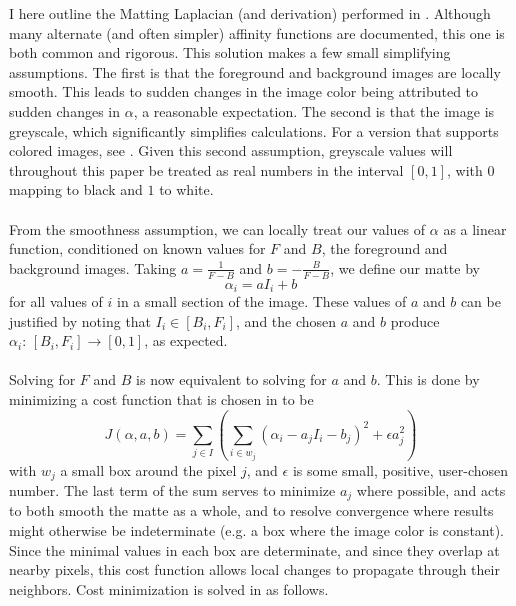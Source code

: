 I here outline the Matting Laplacian (and derivation) performed in \cite{levin08}. Although many alternate (and often simpler) affinity functions are documented, this one is both common and rigorous. This solution makes a few small simplifying assumptions. The first is that the foreground and background images are locally smooth. This leads to sudden changes in the image color being attributed to sudden changes in $\alpha$, a reasonable expectation. The second is that the image is greyscale, which significantly simplifies calculations. For a version that supports colored images, see \cite{levin08}. Given this second assumption, greyscale values will throughout this paper be treated as real numbers in the interval $[0,1]$, with $0$ mapping to black and $1$ to white.
\\\\
From the smoothness assumption, we can locally treat our values of $\alpha$ as a linear function, conditioned on known values for $F$ and $B$, the foreground and background images. Taking $a=\frac{1}{F-B}$ and $b=-\frac{B}{F-B}$, we define our matte by
\[\alpha_i=aI_i+b\]
for all values of $i$ in a small section of the image. These values of $a$ and $b$ can be justified by noting that $I_i\in[B_i,F_i]$, and the chosen $a$ and $b$ produce $\alpha_i:\,[B_i,F_i]\to[0,1]$, as expected.
\\\\
Solving for $F$ and $B$ is now equivalent to solving for $a$ and $b$. This is done by minimizing a cost function that is chosen in \cite{levin08} to be
\[J(\alpha,a,b)=
	\sum_{j\in I}\left(\sum_{i\in w_j}\left(
		\alpha_i-a_jI_i-b_j\right)^2+\epsilon
		a_j^2\right)\]
with $w_j$ a small box around the pixel $j$, and $\epsilon$ is some small, positive, user-chosen number. The last term of the sum serves to minimize $a_j$ where possible, and acts to both smooth the matte as a whole, and to resolve convergence where results might otherwise be indeterminate (e.g. a box where the image color is constant). Since the minimal values in each box are determinate, and since they overlap at nearby pixels, this cost function allows local changes to propagate through their neighbors. Cost minimization is solved in \cite{levin08} as follows.

